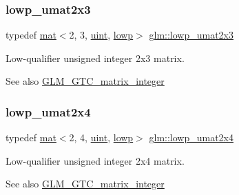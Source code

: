 \subsubsection{\texorpdfstring{lowp\+\_\+umat2x3}{lowp\_umat2x3}}
{\footnotesize\ttfamily typedef \hyperlink{structglm_1_1mat}{mat}$<$2, 3, \hyperlink{group__core__precision_ga4fd29415871152bfb5abd588334147c8}{uint}, \hyperlink{namespaceglm_a36ed105b07c7746804d7fdc7cc90ff25ae161af3fc695e696ce3bf69f7332bc2d}{lowp}$>$ \hyperlink{group__gtc__matrix__integer_gafd5d32892f45c112f974b8d91fc4e25a}{glm\+::lowp\+\_\+umat2x3}}

Low-\/qualifier unsigned integer 2x3 matrix. \begin{DoxySeeAlso}{See also}
\hyperlink{group__gtc__matrix__integer}{G\+L\+M\+\_\+\+G\+T\+C\+\_\+matrix\+\_\+integer} 
\end{DoxySeeAlso}
\mbox{\label{group__gtc__matrix__integer_ga5676b5ed80e507b06b1ac9210a7098df}} 
\subsubsection{\texorpdfstring{lowp\+\_\+umat2x4}{lowp\_umat2x4}}
{\footnotesize\ttfamily typedef \hyperlink{structglm_1_1mat}{mat}$<$2, 4, \hyperlink{group__core__precision_ga4fd29415871152bfb5abd588334147c8}{uint}, \hyperlink{namespaceglm_a36ed105b07c7746804d7fdc7cc90ff25ae161af3fc695e696ce3bf69f7332bc2d}{lowp}$>$ \hyperlink{group__gtc__matrix__integer_ga5676b5ed80e507b06b1ac9210a7098df}{glm\+::lowp\+\_\+umat2x4}}

Low-\/qualifier unsigned integer 2x4 matrix. \begin{DoxySeeAlso}{See also}
\hyperlink{group__gtc__matrix__integer}{G\+L\+M\+\_\+\+G\+T\+C\+\_\+matrix\+\_\+integer} 
\end{DoxySeeAlso}
\mbox{\label{group__gtc__matrix__integer_gaab0c883cd04a3684accd02854daa7b1d}} 

